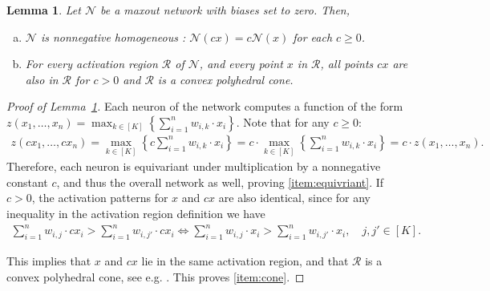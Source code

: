 \documentclass{article}
\newtheorem{lemma}[theorem]{Lemma}
\theoremstyle{definition}
\newcommand{\net}{\mathcal{N}}
\begin{document}
\begin{lemma}
    \label{lem:zero_regions}
    Let $\net$ be a maxout network with biases set to zero. Then,
    \begin{enumerate}[(a)]
        \item $\net$ is
        nonnegative
        homogeneous
        : $\net(cx) = c \net (x)$ for each $c \geq 0$.
        \label{item:equivriant}
        \item For every activation region $\mathcal{R}$ of $\net$, and every point $x$ in $\mathcal{R}$, all points $cx$ are also in $\mathcal{R}$ for $c > 0$ and $\mathcal{R}$ is a convex polyhedral cone.
        \label{item:cone}
    \end{enumerate}
\end{lemma}
\begin{proof}[Proof of Lemma~\ref{lem:zero_regions}]
    Each neuron of the network computes a function of the form $z(x_1, \dots, x_n) = \max_{k \in [K]} \left\{ \sum_{i=1}^n w_{i, k} \cdot x_i \right\}$. Note that for any $c \geq 0$:
    \begin{align*}
        z(c x_1, \dots, c x_n) = \max_{k \in [K]} \left\{ c \sum_{i=1}^n w_{i, k} \cdot x_i \right\} = c \cdot \max_{k \in [K]} \left\{ \sum_{i=1}^n w_{i, k} \cdot x_i \right\} =  c \cdot z(x_1, \dots, x_n).
    \end{align*}
    Therefore, each neuron is equivariant under multiplication by a nonnegative constant $c$, and thus the overall network as well, proving \ref{item:equivriant}. If $c > 0$, the activation patterns for $x$ and $cx$ are also identical, since for any inequality in the activation region definition we have
    \begin{align*}
        \sum_{i=1}^n w_{i, j} \cdot c x_i > \sum_{i=1}^n w_{i, j'} \cdot c x_i \iff \sum_{i=1}^n w_{i, j} \cdot x_i > \sum_{i=1}^n w_{i, j'} \cdot x_i, \quad j,j' \in [K].
    \end{align*}
    
    This implies that $x$ and $cx$ lie in the same activation region, and that $\mathcal{R}$ is a convex polyhedral cone, see e.g. \citet{chandru2011optimization}. This proves \ref{item:cone}.
\end{proof}
\end{document}
